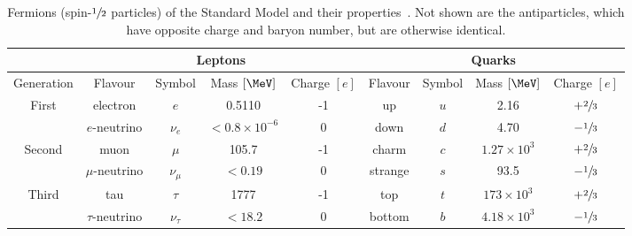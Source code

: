 \begin{table}[h]
    \centering
    \caption{Fermions (spin-$\sfrac{1}{2}$ particles) of the Standard Model and their properties~\cite{ParticleDataGroup}. Not shown are the antiparticles, which have opposite charge and baryon number, but are otherwise identical.}
    \begin{adjustbox}{max width=\textwidth}
        \label{tab:fermions}
        \renewcommand{\arraystretch}{1.5}
        \begin{tabular}{c|cccc|cccc}
            \toprule
            \hline
                                    & \multicolumn{4}{c}{Leptons} & \multicolumn{4}{|c}{Quarks}                                                                                                   \\
            \hline
            Generation              & Flavour                     & Symbol                      & Mass $[\MeV]$          & Charge $[e]$ & Flavour & Symbol & Mass $[\MeV]$      & Charge $[e]$    \\
            \hline
            \multirow{2}{*}{First}  & electron                    & $e$                         & 0.5110                 & -1           & up      & $u$    & 2.16               & $+\sfrac{2}{3}$ \\
                                    & $e$-neutrino                & $\nu_e$                     & $< 0.8 \times 10^{-6}$ & 0            & down    & $d$    & 4.70               & $-\sfrac{1}{3}$ \\
            \hline
            \multirow{2}{*}{Second} & muon                        & $\mu$                       & 105.7                  & -1           & charm   & $c$    & $1.27 \times 10^3$ & $+\sfrac{2}{3}$ \\
                                    & $\mu$-neutrino              & $\nu_\mu$                   & $< 0.19$               & 0            & strange & $s$    & 93.5               & $-\sfrac{1}{3}$ \\
            \hline
            \multirow{2}{*}{Third}  & tau                         & $\tau$                      & 1777                   & -1           & top     & $t$    & $173 \times 10^3$  & $+\sfrac{2}{3}$ \\
                                    & $\tau$-neutrino             & $\nu_\tau$                  & $< 18.2$               & 0            & bottom  & $b$    & $4.18 \times 10^3$ & $-\sfrac{1}{3}$ \\
            \hline
        \end{tabular}
    \end{adjustbox}
\end{table}

